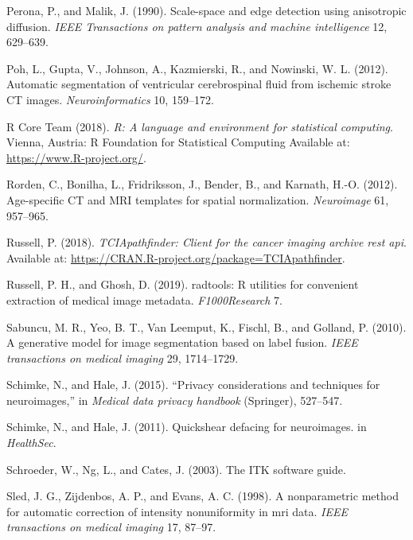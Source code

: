 \documentclass[utf8]{frontiersSCNS}
\begin{document}
\leavevmode\hypertarget{ref-peronamalik}{}%
Perona, P., and Malik, J. (1990). Scale-space and edge detection using anisotropic diffusion. \emph{IEEE Transactions on pattern analysis and machine intelligence} 12, 629--639.

\leavevmode\hypertarget{ref-poh2012automatic}{}%
Poh, L., Gupta, V., Johnson, A., Kazmierski, R., and Nowinski, W. L. (2012). Automatic segmentation of ventricular cerebrospinal fluid from ischemic stroke CT images. \emph{Neuroinformatics} 10, 159--172.

\leavevmode\hypertarget{ref-R}{}%
R Core Team (2018). \emph{R: A language and environment for statistical computing}. Vienna, Austria: R Foundation for Statistical Computing Available at: \url{https://www.R-project.org/}.

\leavevmode\hypertarget{ref-rorden2012age}{}%
Rorden, C., Bonilha, L., Fridriksson, J., Bender, B., and Karnath, H.-O. (2012). Age-specific CT and MRI templates for spatial normalization. \emph{Neuroimage} 61, 957--965.

\leavevmode\hypertarget{ref-TCIApathfinder}{}%
Russell, P. (2018). \emph{TCIApathfinder: Client for the cancer imaging archive rest api}. Available at: \url{https://CRAN.R-project.org/package=TCIApathfinder}.

\leavevmode\hypertarget{ref-radtools}{}%
Russell, P. H., and Ghosh, D. (2019). radtools: R utilities for convenient extraction of medical image metadata. \emph{F1000Research} 7.

\leavevmode\hypertarget{ref-sabuncu2010generative}{}%
Sabuncu, M. R., Yeo, B. T., Van Leemput, K., Fischl, B., and Golland, P. (2010). A generative model for image segmentation based on label fusion. \emph{IEEE transactions on medical imaging} 29, 1714--1729.

\leavevmode\hypertarget{ref-schimke2015privacy}{}%
Schimke, N., and Hale, J. (2015). ``Privacy considerations and techniques for neuroimages,'' in \emph{Medical data privacy handbook} (Springer), 527--547.

\leavevmode\hypertarget{ref-quickshear}{}%
Schimke, N., and Hale, J. (2011). Quickshear defacing for neuroimages. in \emph{HealthSec}.

\leavevmode\hypertarget{ref-itk}{}%
Schroeder, W., Ng, L., and Cates, J. (2003). The ITK software guide.

\leavevmode\hypertarget{ref-sled1998nonparametric}{}%
Sled, J. G., Zijdenbos, A. P., and Evans, A. C. (1998). A nonparametric method for automatic correction of intensity nonuniformity in mri data. \emph{IEEE transactions on medical imaging} 17, 87--97.
\end{document}
